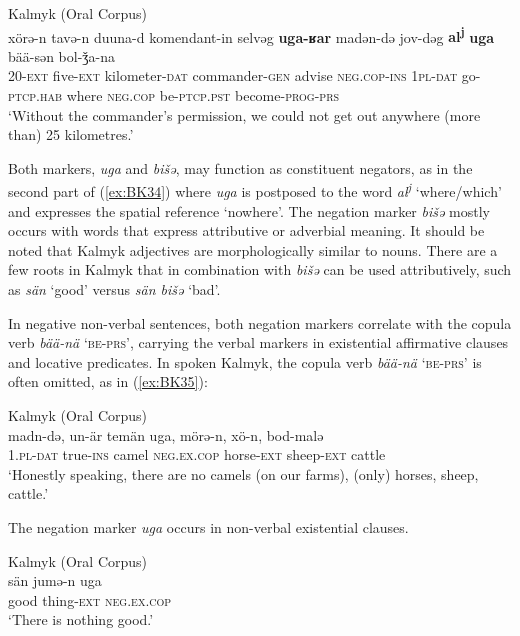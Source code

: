 \documentclass[output=paper]{langsci/langscibook}
\begin{document}
\ea Kalmyk (Oral Corpus) \label{ex:BK34}\\
	\gll xörǝ-n		tavǝ-n	duuna-d			komendant-in		selvǝg	\textbf{uga-ʁar}			madǝn-dǝ	jov-dǝg		\textbf{al\textsuperscript{j}}			\textbf{uga}	bää-sǝn		bol-ǯa-na\\
	20-\textsc{ext}	five-\textsc{ext}	kilometer-\textsc{dat}	commander-\textsc{gen}	advise	\textsc{neg.cop-ins}	\textsc{1pl-dat}		go-\textsc{ptcp.hab}	where	\textsc{neg.cop}	be-\textsc{ptcp.pst}	become-\textsc{prog-prs}\\
	\glt `Without the commander’s permission, we could not get out anywhere (more than) 25 kilometres.'
\z


Both markers, \textit{uga} and \textit{bišǝ}, may function as constituent negators, as in the second part of (\ref{ex:BK34}) where \textit{uga} is postposed to the word \textit{al\textsuperscript{j}} ‘where/which’ and expresses the spatial reference ‘nowhere’. The negation marker \textit{bišǝ} mostly occurs with words that express attributive or adverbial meaning. It should be noted that Kalmyk adjectives are morphologically similar to nouns. There are a few roots in Kalmyk that in combination with \textit{bišǝ} can be used attributively, such as \textit{sän} ‘good’ versus \textit{sän bišǝ} ‘bad’.

In negative non-verbal sentences, both negation markers correlate with the copula verb \textit{bää-nä} ‘\textsc{be-prs}’, carrying the verbal markers in existential affirmative clauses and locative predicates. In spoken Kalmyk, the copula verb \textit{bää-nä} ‘\textsc{be-prs}’ is often omitted, as in (\ref{ex:BK35}):

\ea Kalmyk (Oral Corpus) \label{ex:BK35}\\
	\gll madn-də,		un-är		temän	uga,	mörə-n,		xö-n,			bod-malə\\
	1.\textsc{pl-dat}		true-\textsc{ins}	camel	\textsc{neg.ex.cop}	horse-\textsc{ext}	sheep-\textsc{ext}	cattle\\
	\glt `Honestly speaking, there are no camels (on our farms), (only) horses, sheep, cattle.'
\z


The negation marker \textit{uga} occurs in non-verbal existential clauses.

\ea Kalmyk (Oral Corpus) \label{ex:BK36}\\
	\gll sän		jumǝ-n		uga\\
	good	thing-\textsc{ext}	\textsc{neg.ex.cop}\\
	\glt `There is nothing good.'
\z
\end{document}
